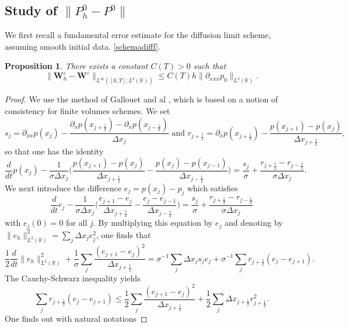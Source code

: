 \documentclass[a4paper,french,english,10pt]{article}
\newcommand\eps{\varepsilon}
\newcommand\W{\mathbf{W}}
\newtheorem{proposition}[theorem]{Proposition}
\begin{document}
\subsection{Study of $\| P_h^0 - P^0  \|$}

We  first 
 recall a fundamental   error estimate \cite{FV}
for the diffusion limit scheme, assuming smooth initial data.
\eqref{schemadifff}. 
\begin{proposition}\label{ds1d}
There exists a constant $C(T)>0$ such that
\begin{equation*}
\|\W_h^\eps-\W^\eps\|_{L^{\infty}([0,T];L^2(\mathbb{R}))} \leq
C(T)h \| \partial_{xxx}p_0 \|_{L^2(\mathbb{R})  }.
\end{equation*}
\end{proposition}

\begin{proof}
We  use the method of Gallouet and al \cite{FV}, which
is based on  a notion of consistency for finite volumes schemes.
We set
$$
s_j=\partial_{xx}p(x_j)-\frac{\partial_xp(x_{j+\frac12}  )
-
\partial_xp(x_{j-\frac12}  )
}{\Delta x_j}
\mbox{ and }
r_{j+\frac12}=\partial_{x}p(x_{j+\frac12})-\frac{p(x_{j+1}  )
-
p(x_{j}  )
}{\Delta x_{j+\frac12}},
$$
so that one has the identity
$$
 \frac{d}{dt} p(x_j)
-\frac{1}{\sigma\Delta x_j}\bigg(\frac{p(x_{j+1})-p(x_{j})}{\Delta
x_{j+\frac12 }}-\frac{p(x_{j})-p(x_{j-1})}{\Delta
x_{j-\frac12 }}\bigg)=
\frac{s_j}\sigma+
\frac{r_{j+\frac12}-r_{j-\frac12}}{\sigma \Delta x_j}.
$$
We next  introduce the difference
$e_j=p(x_j)-p_j$ which satisfies
$$
 \frac{d}{dt} e_j
-\frac{1}{\sigma\Delta x_j}\bigg(\frac{e_{j+1}-e_{j}}{\Delta
x_{j+\frac12 }}-\frac{e_{j}-e_{j-1}}{\Delta
x_{j-\frac12 }}\bigg)=
\frac{s_j}\sigma+
\frac{r_{j+\frac12}-r_{j-\frac12}}{\sigma \Delta x_j}
$$
with $e_j(0)=0$ for all $j$.
By multiplying this equation by $e_j$
and  denoting by $\|e_h\|_{L^2(\mathbb{R})}^2= \sum_j \Delta x_je_j^2$,
one finds that 
\begin{equation*}\label{fgfg}
\frac12 \frac{d}{dt}\|e_h\|_{L^2(\mathbb{R})}^2 +\frac{1}{\sigma} \sum_j
\frac{(e_{j+1}-e_{j})^2}{\Delta
x_{j+\frac12 }}=
\sigma^{-1}\sum_j \Delta x_j s_j e_j+\sigma^{-1}\sum_jr_{j+\frac12 }(e_j-e_{j+1}).
\end{equation*}
The Cauchy-Schwarz inequality yields 
\begin{equation*}
\sum_jr_{j+\frac12 }(e_j-e_{j+1})\leq \frac{1}{2} \sum_j
\frac{(e_{j+1}-e_{j})^2}{\Delta x_{j+\frac12 }}+\frac{1}{2}\sum_j\Delta
x_{j+\frac12 }r_{j+\frac12 }^2.
\end{equation*}
One finds out with natural notations

\end{proof}
\end{document}
